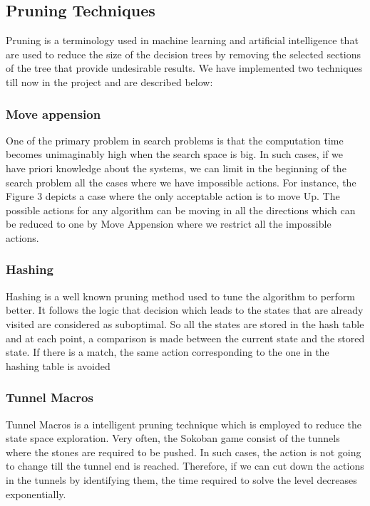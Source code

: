 \subsection{Pruning Techniques}
\noindent Pruning is a terminology used in machine learning and artificial intelligence that are used to reduce the size of the decision trees by removing the selected sections of the tree that provide undesirable results. We have implemented two techniques till now in the project and are described below:
\subsubsection{Move appension}
\noindent One of the primary problem in search problems is that the computation time becomes unimaginably high when the search space is big. In such cases, if we have priori knowledge about the systems, we can limit in the beginning of the search problem all the cases where we have impossible actions. For instance, the Figure 3 depicts a case where the only acceptable action is to move Up. The possible actions for any algorithm can be moving in all the directions which can be reduced to one by Move Appension where we restrict all the impossible actions.
\subsubsection{Hashing}
\noindent Hashing is a well known pruning method used to tune the algorithm to perform better. It follows the logic that decision which leads to the states that are already visited are considered as suboptimal. So all the states are stored in the hash table and at each point, a comparison is made between the current state and the stored state. If there is a match, the same action corresponding to the one in the hashing table is avoided
\subsubsection{Tunnel Macros}
\noindent Tunnel Macros is a intelligent pruning technique which is employed to reduce the state space exploration. Very often, the Sokoban game consist of the tunnels where the stones are required to be pushed. In such cases, the action is not going to change till the tunnel end is reached. Therefore, if we can cut down the actions in the tunnels by identifying them, the time required to solve the level decreases exponentially.

